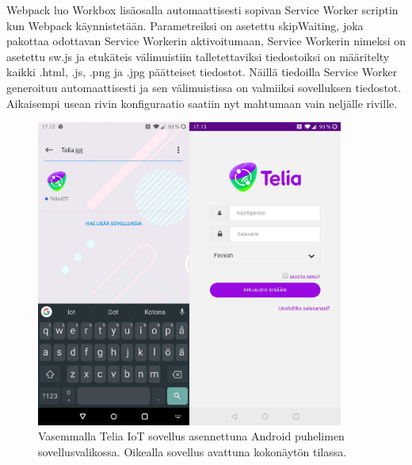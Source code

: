 \documentclass{tktltiki}
\begin{document}
Webpack luo Workbox lisäosalla automaattisesti sopivan Service Worker scriptin kun Webpack käynnistetään. Parametreiksi on asetettu skipWaiting, joka pakottaa odottavan Service Workerin aktivoitumaan, Service Workerin nimeksi on asetettu sw.js ja etukäteis välimuistiin talletettaviksi tiedostoiksi on määritelty kaikki .html, .js, .png ja .jpg päätteiset tiedostot. Näillä tiedoilla Service Worker generoituu automaattisesti ja sen välimuistissa on valmiiksi sovelluksen tiedostot. Aikaisempi usean rivin konfiguraatio saatiin nyt mahtumaan vain neljälle riville. 


\begin{figure}[!ht]
  \centering
    \includegraphics[width=0.9\textwidth]{teliaiot_puhelimessa.jpg}
      \caption{Vasemmalla Telia IoT sovellus asennettuna Android puhelimen sovellusvalikossa. Oikealla sovellus avattuna kokonäytön tilassa.}
      \label{teliaiot_puhelimessa_asennettuna}
\end{figure}
\end{document}
